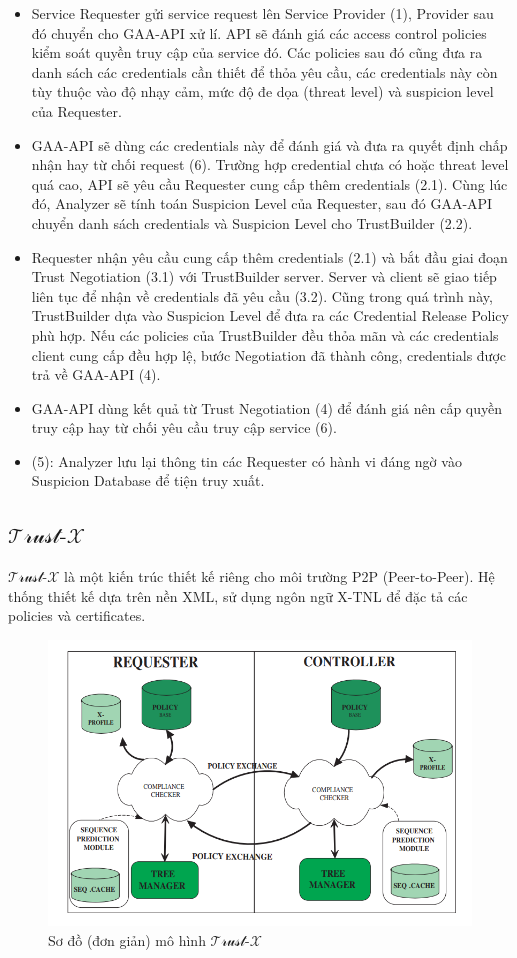 \documentclass[12pt]{article}
\newcommand{\trustx}{$\mathcal{\text{Trust-}X}$}
\begin{document}
\begin{itemize}
\item Service Requester gửi service request lên Service Provider (1), Provider sau đó chuyển cho GAA-API xử lí. API sẽ đánh giá các access control policies kiểm soát quyền truy cập của service đó. Các policies sau đó cũng đưa ra danh sách các credentials cần thiết để thỏa yêu cầu, các credentials này còn tùy thuộc vào độ nhạy cảm, mức độ đe dọa (threat level) và suspicion level của Requester.
\item GAA-API sẽ dùng các credentials này để đánh giá và đưa ra quyết định chấp nhận hay từ chối request (6). Trường hợp credential chưa có hoặc threat level quá cao, API sẽ yêu cầu Requester cung cấp thêm credentials (2.1). Cùng lúc đó, Analyzer sẽ tính toán Suspicion Level của Requester, sau đó GAA-API chuyển danh sách credentials và Suspicion Level cho TrustBuilder (2.2).
\item Requester nhận yêu cầu cung cấp thêm credentials (2.1) và bắt đầu giai đoạn Trust Negotiation (3.1) với TrustBuilder server. Server và client sẽ giao tiếp liên tục để nhận về credentials đã yêu cầu (3.2). Cũng trong quá trình này, TrustBuilder dựa vào Suspicion Level để đưa ra các Credential Release Policy phù hợp. Nếu các policies của TrustBuilder đều thỏa mãn và các credentials client cung cấp đều hợp lệ, bước Negotiation đã thành công, credentials được trả về GAA-API (4).
\item GAA-API dùng kết quả từ Trust Negotiation (4) để đánh giá nên cấp quyền truy cập hay từ chối yêu cầu truy cập service (6).
\item (5): Analyzer lưu lại thông tin các Requester có hành vi đáng ngờ vào Suspicion Database để tiện truy xuất.
\end{itemize}

\subsection{\trustx}
\trustx\cite{10.1109/TKDE.2004.1318565} là một kiến trúc thiết kế riêng cho môi trường P2P (Peer-to-Peer). Hệ thống thiết kế dựa trên nền XML, sử dụng ngôn ngữ X-TNL để đặc tả các policies và certificates. 

\begin{figure}[H]
\centering
\includegraphics[scale=.8]{img/trust-x-architecture.png}
\caption{Sơ đồ (đơn giản) mô hình \trustx}
\end{figure}
\end{document}

